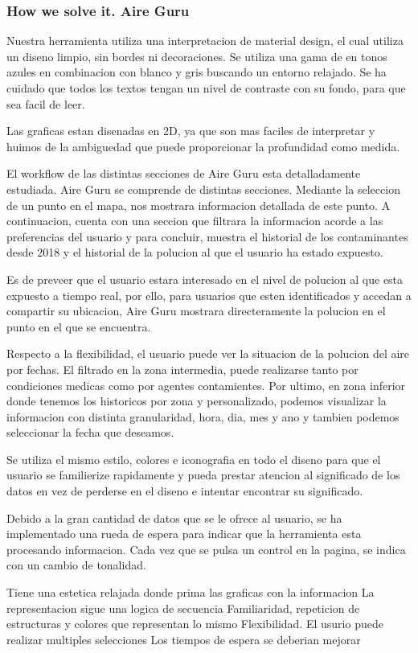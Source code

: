 \subsubsection{How we solve it. Aire Guru} 
Nuestra herramienta utiliza una interpretacion de material design, el cual utiliza un diseno limpio, sin bordes ni decoraciones.
Se utiliza una gama de en tonos azules en combinacion con blanco y gris buscando un entorno relajado. 
Se ha cuidado que todos los textos tengan un nivel de contraste con su fondo, para que sea facil de leer.

Las graficas estan disenadas en 2D, ya que son mas faciles de interpretar y huimos de la ambiguedad que puede
proporcionar la profundidad como medida.


El workflow de las distintas secciones de Aire Guru esta detalladamente estudiada.
Aire Guru se comprende de distintas secciones. Mediante la seleccion de un punto en el mapa, nos
mostrara informacion detallada de este punto. A continuacion, cuenta con una seccion que filtrara la informacion acorde a las preferencias del usuario
y para concluir, muestra el historial de los contaminantes desde 2018 y el historial de la polucion al que el usuario ha estado
expuesto. 

Es de preveer que el usuario estara interesado en el nivel de polucion al que esta expuesto a tiempo real, por ello, para usuarios
que esten identificados y accedan a compartir su ubicacion, Aire Guru mostrara directeramente la polucion en el punto en el 
que se encuentra.

Respecto a la flexibilidad, el usuario puede ver la situacion de la polucion del aire por fechas. El filtrado en la zona
intermedia, puede realizarse tanto por condiciones medicas como por agentes contamientes. Por ultimo, en zona inferior donde tenemos
los historicos por zona y personalizado, podemos visualizar la informacion con distinta granularidad, hora, dia, mes y ano y tambien podemos
seleccionar la fecha que deseamos.


Se utiliza el mismo estilo, colores e iconografia en todo el diseno para que el usuario se familierize rapidamente y pueda
prestar atencion al significado de los datos en vez de perderse en el diseno e intentar encontrar su significado. 

Debido a la gran cantidad de datos que se le ofrece al usuario, se ha implementado una rueda de espera para indicar
que la herramienta esta procesando informacion. Cada vez que se pulsa un control en la pagina, se indica con un cambio
de tonalidad.
\begin{itemize}
    \done Tiene una estetica relajada donde prima las graficas con la informacion
    \done La representacion sigue una logica de secuencia
    \done Familiaridad, repeticion de estructuras y colores que representan lo mismo
    \done Flexibilidad. El usurio puede realizar multiples selecciones
    \crossed Los tiempos de espera se deberian mejorar
\end{itemize}
\newpage